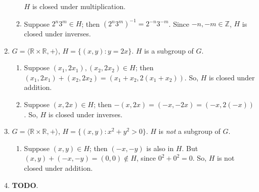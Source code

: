 \documentclass{article}
\begin{document}
\begin{enumerate}
\begin{enumerate}[label=(\roman*)]
                $H$ is closed under multiplication. 
            \item Suppose $2^{n}3^{m} \in H$; then $(2^{n}3^{m})^{-1} = 2^{-n}3^{-m}$. Since $-n, -m \in \mathbb{Z}$, $H$ is closed under inverses.
        \end{enumerate}
    \item $G = \langle \mathbb{R} \times \mathbb{R}, + \rangle$, $H = \{(x, y): y = 2x\}$. $H$ is a subgroup of $G$.
        \begin{enumerate}[label=(\roman*)]
            \item Suppose $(x_1, 2x_1), (x_2, 2x_2) \in H$; then $(x_1, 2x_1) + (x_2, 2x_2) = (x_1 + x_2, 2(x_1 + x_2))$. So, 
                $H$ is closed under addition. 
            \item Suppose $(x, 2x) \in H$; then $-(x, 2x) = (-x, -2x) = (-x, 2(-x))$. So, $H$ is closed under inverses.
        \end{enumerate}
    \item $G = \langle \mathbb{R} \times \mathbb{R}, + \rangle$, $H = \{(x, y): x^2 + y^2 > 0\}$. $H$ is \emph{not} a subgroup of $G$.
        \begin{enumerate}[label=(\roman*)]
            \item Suppose $(x, y) \in H$; then $(-x, -y)$ is also in $H$. But $(x, y) + (-x, -y) = (0, 0) \notin H$, since $0^2 + 0^2 = 0$. So, $H$ is not closed under addition. 
        \end{enumerate}
    \item \textbf{TODO}.
\end{enumerate}
\end{document}
